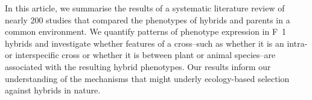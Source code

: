 \documentclass[times, twoside, watermark]{zHenriquesLab-StyleBioRxiv}
\begin{document}
In this article, we summarise the results of a systematic literature review of nearly 200 studies that compared the phenotypes of hybrids and parents in a common environment. We quantify patterns of phenotype expression in F~1~ hybrids and investigate whether features of a cross--such as whether it is an intra- or interspecific cross or whether it is between plant or animal species--are associated with the resulting hybrid phenotypes. Our results inform our understanding of the mechanisms that might underly ecology-based selection against hybrids in nature.




\end{document}
